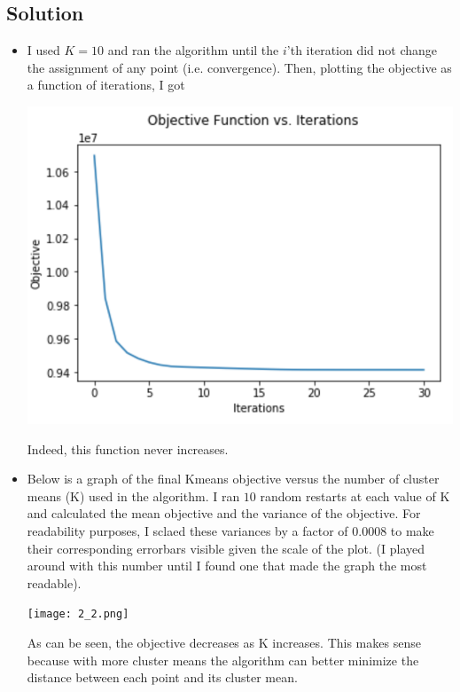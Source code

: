 \documentclass[submit]{harvardml}
\begin{document}
\subsection*{Solution}

\begin{itemize}

\item I used $K = 10$ and ran the algorithm until the $i$'th iteration did not change the assignment of any point (i.e. convergence). Then, plotting the objective as a function of iterations, I got

\begin{center}
\includegraphics{2_1.png}
\end{center}

Indeed, this function never increases.

\item

Below is a graph of the final Kmeans objective versus the number of cluster means (K) used in the algorithm. I ran $10$ random restarts at each value of K and calculated the mean objective and the variance of the objective. For readability purposes, I sclaed these variances by a factor of 0.0008 to make their corresponding errorbars visible given the scale of the plot. (I played around with this number until I found one that made the graph the most readable).

\begin{center}
\texttt{[image: 2\_2.png]}
\end{center}

As can be seen, the objective decreases as K increases. This makes sense because with more cluster means the algorithm can better minimize the distance between each point and its cluster mean. 


\end{itemize}
\end{document}
